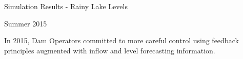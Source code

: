 \documentclass[compress,english]{beamer}
\begin{document}
\begin{frame}{Simulation Results - Rainy Lake Levels}

\vfill
\centering
{}
\vfill

\end{frame}

\begin{frame}{Summer 2015}

In 2015, Dam Operators committed to more careful control using feedback principles augmented with inflow and level forecasting information.


\end{frame}
\end{document}
